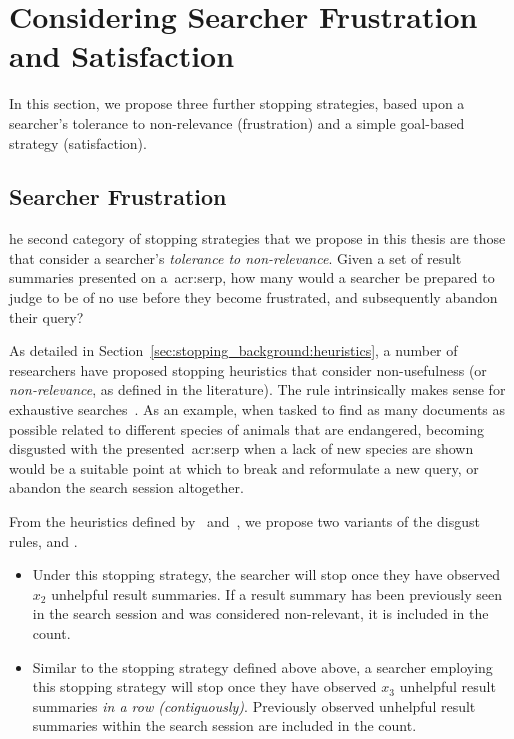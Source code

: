 \section{Considering Searcher Frustration and Satisfaction}
In this section, we propose three further stopping strategies, based upon a searcher's tolerance to non-relevance (frustration) and a simple goal-based strategy (satisfaction).

\subsection{Searcher Frustration}\label{sec:strategies:frustsat:frustration}
he second category of stopping strategies that we propose in this thesis are those that consider a searcher's \emph{tolerance to non-relevance}. Given a set of result summaries presented on a~\gls{acr:serp}, how many would a searcher be prepared to judge to be of no use before they become frustrated, and subsequently abandon their query?

As detailed in Section~\ref{sec:stopping_background:heuristics}, a number of researchers have proposed stopping heuristics that consider non-usefulness (or \emph{non-relevance}, as defined in the literature). The rule intrinsically makes sense for exhaustive searches~\cite{kraft1979stopping_rules}. As an example, when tasked to find as many documents as possible related to different species of animals that are endangered, becoming disgusted with the presented~\gls{acr:serp} when a lack of new species are shown would be a suitable point at which to break and reformulate a new query, or abandon the search session altogether.

From the heuristics defined by~\citealt{cooper1973retrieval_effectiveness_ii} and~\citealt{kraft1979stopping_rules}, we propose two variants of the disgust rules,  and .

\begin{itemize}
    
    \item[]{} Under this stopping strategy, the searcher will stop once they have observed $x_2$ unhelpful result summaries. If a result summary has been previously seen in the search session and was considered non-relevant, it is included in the count.
    
    \item[]{} Similar to the stopping strategy defined above above, a searcher employing this stopping strategy will stop once they have observed $x_3$ unhelpful result summaries \emph{in a row (contiguously)}. Previously observed unhelpful result summaries within the search session are included in the count.
    
\end{itemize}

